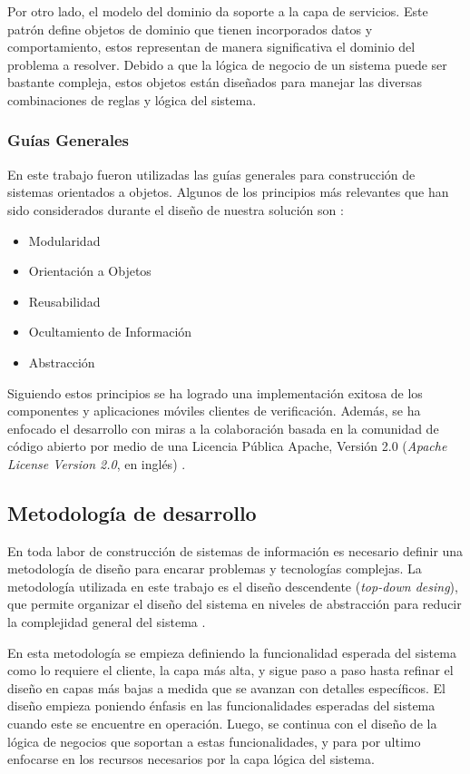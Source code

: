 Por otro lado, el modelo del dominio da soporte a la capa de servicios.
Este patrón define objetos de dominio que tienen incorporados datos
y comportamiento, estos representan de manera significativa el dominio
del problema a resolver. Debido a que la lógica de negocio de un sistema
puede ser bastante compleja, estos objetos están diseñados para manejar
las diversas combinaciones de reglas y lógica del sistema.

\subsubsection{Guías Generales}

En este trabajo fueron utilizadas las guías generales para construcción
de sistemas orientados a objetos. Algunos de los principios más relevantes
que han sido considerados durante el diseño de nuestra solución son
\cite{Albin2003}:
\begin{itemize}
\item Modularidad
\item Orientación a Objetos
\item Reusabilidad
\item Ocultamiento de Información
\item Abstracción
\end{itemize}
Siguiendo estos principios se ha logrado una implementación exitosa
de los componentes y aplicaciones móviles clientes de verificación.
Además, se ha enfocado el desarrollo con miras a la colaboración basada
en la comunidad de código abierto por medio de una Licencia Pública
Apache, Versión 2.0 (\emph{Apache License Version 2.0}, en inglés)
\cite{GimenezYegros2016c}.

\subsection{Metodología de desarrollo}

En toda labor de construcción de sistemas de información es necesario
definir una metodología de diseño para encarar problemas y tecnologías
complejas. La metodología utilizada en este trabajo es el diseño descendente
(\emph{top-down desing}), que permite organizar el diseño del sistema
en niveles de abstracción para reducir la complejidad general del
sistema \cite{Albin2003}. 

En esta metodología se empieza definiendo la funcionalidad esperada
del sistema como lo requiere el cliente, la capa más alta, y sigue
paso a paso hasta refinar el diseño en capas más bajas a medida que
se avanzan con detalles específicos. El diseño empieza poniendo énfasis
en las funcionalidades esperadas del sistema cuando este se encuentre
en operación. Luego, se continua con el diseño de la lógica de negocios
que soportan a estas funcionalidades, y para por ultimo enfocarse
en los recursos necesarios por la capa lógica del sistema.

